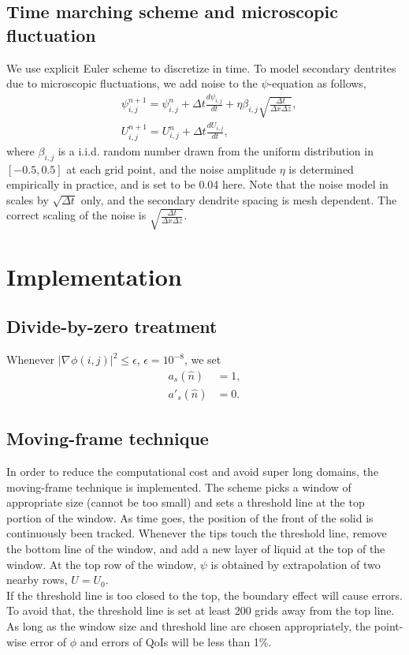 \documentclass[final,times]{elsarticle}
\numberwithin{equation}{section}
\newcommand{\grad}[1]{\nabla_{#1}}
\begin{document}
\subsection{Time marching scheme and microscopic fluctuation}
We use explicit Euler scheme to discretize  in time. To model secondary dentrites due to microscopic fluctuations, we add noise to the $\psi$-equation as follows,
\begin{align}
& \psi_{i,j}^{n+1} = \psi_{i,j}^n + \Delta t  \frac{d \psi_{i,j}}{dt}  + \eta \beta_{i,j} \sqrt{ \frac{\Delta t}{ \Delta x \Delta z}  },  \\
& U_{i,j} ^{n+1} = U_{i,j}^n + \Delta t \frac{dU_{i,j}}{dt},
\end{align}
where $\beta_{i,j}$ is a i.i.d. random number drawn from the uniform distribution in $[-0.5,0.5]$ at each grid point, and the noise amplitude $\eta$ is determined empirically in practice, and is set to be 0.04 here. Note that the noise model in \cite{Tourret2015} scales by $\sqrt{\Delta t}$ only, and the secondary dendrite spacing is mesh dependent. The correct scaling of the noise is $\sqrt{ \frac{\Delta t}{ \Delta x \Delta z}  }$.

\section{Implementation}


\subsection{Divide-by-zero treatment}
Whenever $|\grad{}\phi(i,j)|^{2} \leq \epsilon $, $\epsilon = 10^{-8}$, we set \cite{Provatas2010}
\begin{align*}
a_s(\hat{n}) &= 1, \\
a'_s(\hat{n}) &= 0.
\end{align*}

\subsection{Moving-frame technique}
In order to reduce the computational cost and avoid super long domains, the moving-frame technique is implemented. The scheme picks a window of appropriate size (cannot be too small) and sets a threshold line at the top portion of the window. As time goes, the position of the front of the solid is continuously been tracked. Whenever the tips touch the threshold line, remove the bottom line of the window, and add a new layer of liquid at the top of the window. At the top row of the window, $\psi$ is obtained by extrapolation of two nearby rows, $U=U_0$. \\
If the threshold line is too closed to the top, the boundary effect will cause errors. To avoid that, the threshold line is set at least 200 grids away from the top line. As long as the window size and threshold line are chosen appropriately, the point-wise error of $\phi$ and errors of QoIs will be less than 1\%.
\end{document}
